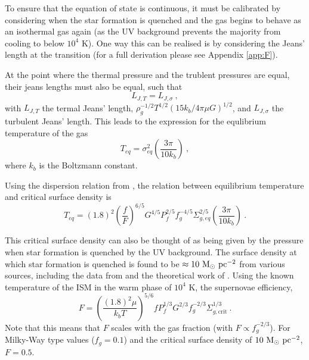 To ensure that the equation of state is continuous, it must be calibrated by considering when the star formation is quenched and the gas begins to behave as an isothermal gas again (as the UV background prevents the majority from cooling to below $10^4$ K).
One way this can be realised is by considering the Jeans' length at the transition (for a full derivation please see Appendix \ref{app:F}).

At the point where the thermal pressure and the trublent pressures are equal, their jeans lengths must also be equal, such that
$$
     L_{J, T} = L_{J, \sigma}~,
$$
with $L_{J, T}$ the termal Jeans' length, $ \rho_g^{-1/2} T^{1/2} \left({15k_b}/{4\pi \mu G}\right)^{1/2} $, and $L_{J, \sigma}$ the turbulent Jeans' length.
This leads to the expression for the equlibrium temperature of the gas
\begin{equation}
    T_{eq} = \sigma^2_{eq} \left(\frac{3 \pi}{10 k_b}\right)~,
    \label{eqn:teq}
\end{equation}
where $k_b$ is the Boltzmann constant.

Using the dispersion relation from \citet{martizzi_supernova_2015}, the relation between equilibrium temperature and critical surface density is
$$
  T_{eq} = (1.8)^2 \left(\frac{f}{F}\right)^{6/5} G^{4/5} P_f^{2/5} f_g^{-4/5} \Sigma_{g, eq}^{2/5} \left(\frac{3\pi}{10k_b}\right)~.
$$

This critical surface density can also be thought of as being given by the pressure when star formation is quenched by the UV background.
The surface density at which star formation is quenched is found to be $\approx 10 ~\mathrm{M}_{\odot} ~\mathrm{pc}^{-2}$ from various sources, including the data from \citet{bigiel_star_2008} and the theoretical work of \citet{schaye_star_2004}.
Using the known temperature of the ISM in the warm phase of $10^{4}$ K, the supernovae efficiency,
\begin{equation}
    F = \left(\frac{(1.8)^2 \mu}{k_b T}\right)^{5/6} f P_f^{1/3} G^{2/3} f_g^{-2/3} \Sigma_{g, \mathrm{crit}}^{1/3}~.
    \label{eqn:Fcalib}
\end{equation}
Note that this means that $F$ scales with the gas fraction (with $F \propto f_g^{-2/3}$).
For Milky-Way type values ($f_g = 0.1$) and the critical surface density of $10 ~\mathrm{M}_{\odot} ~\mathrm{pc}^{-2}$, $F=0.5$.
